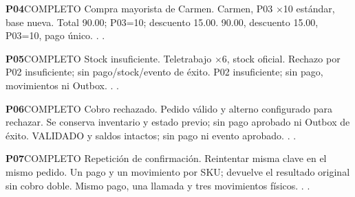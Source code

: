 \par\medskip\noindent\begin{minipage}{\linewidth}
\noindent\textbf{\large P04}\quad\textsf{COMPLETO}
 Compra mayorista de Carmen.
 Carmen, P03 $\times$10 estándar, base nueva.
 Total 90.00; P03=10; descuento 15.00.
 90.00, descuento 15.00, P03=10, pago único.
 . .
\end{minipage}\par
\par\medskip\noindent\begin{minipage}{\linewidth}
\noindent\textbf{\large P05}\quad\textsf{COMPLETO}
 Stock insuficiente.
 Teletrabajo $\times$6, stock oficial.
 Rechazo por P02 insuficiente; sin pago/stock/evento de éxito.
 P02 insuficiente; sin pago, movimientos ni Outbox.
 . .
\end{minipage}\par
\par\medskip\noindent\begin{minipage}{\linewidth}
\noindent\textbf{\large P06}\quad\textsf{COMPLETO}
 Cobro rechazado.
 Pedido válido y alterno configurado para rechazar.
 Se conserva inventario y estado previo; sin pago aprobado ni Outbox de éxito.
 VALIDADO y saldos intactos; sin pago ni evento aprobado.
 . .
\end{minipage}\par
\par\medskip\noindent\begin{minipage}{\linewidth}
\noindent\textbf{\large P07}\quad\textsf{COMPLETO}
 Repetición de confirmación.
 Reintentar misma clave en el mismo pedido.
 Un pago y un movimiento por SKU; devuelve el resultado original sin cobro doble.
 Mismo pago, una llamada y tres movimientos físicos.
 . .
\end{minipage}\par
